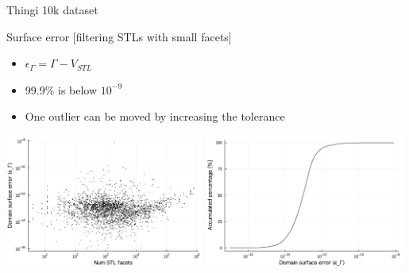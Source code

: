 \documentclass{beamer}
\begin{document}
\begin{frame}{Thingi 10k dataset}

  \begin{block}{Surface error [filtering STLs with small facets]}
  \begin{itemize}
    \item
      $\epsilon_\Gamma = \Gamma - V_{STL}$
    \item
      99.9\% is below $10^{-9}$
    \item
      One outlier can be moved by increasing the tolerance
  \end{itemize}
  \end{block}

  \includegraphics[width=0.49\textwidth]{../analysis/plots/filter_num_stl_facets_surface_error}
  \includegraphics[width=0.49\textwidth]{../analysis/plots/filter_histogram_surface_error}
\end{frame}
\end{document}

